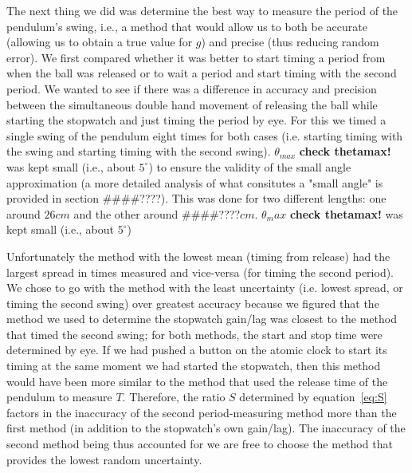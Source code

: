 \documentclass[iop,numberedappendix,appendixfloats]{emulateapj}
\def\g{$g$}
\def\T{$T$}
\def\fillin{\#\#\#\#????}
\def\deg{^{\circ}}
\begin{document}
The next thing we did was determine the best way to measure the period of the 
pendulum's swing, i.e., a method that would allow us to both be accurate 
(allowing us to obtain a true value for \g) and precise (thus reducing random 
error). We first compared whether it was better to start timing a period from 
when the ball was released or to wait a period and start timing with the 
second period.  We wanted to see if there was a difference in accuracy and 
precision between the simultaneous double hand movement of releasing the ball 
while starting the stopwatch and just timing the period by eye. For this we 
timed a single swing of the pendulum eight times for both cases (i.e. starting 
timing with the swing and starting timing with the second swing). $\theta_{max}$ 
{\bf check thetamax!} was kept small (i.e., about $5\deg$) to ensure the 
validity of the small angle approximation (a more detailed analysis of what 
consitutes a "small angle" is provided in section \fillin). This was done 
for two different lengths: one around $26cm$ and the other around \fillin$cm$. 
$\theta_max$ {\bf check thetamax!} was kept small (i.e., about $5\deg$) 

Unfortunately the method with the lowest 
mean (timing from release) had the largest spread in times measured and 
vice-versa (for timing the second period). We chose to go 
with the method with the least uncertainty (i.e. lowest spread, or timing the 
second swing) over greatest accuracy because we figured that the method we 
used to determine the stopwatch gain/lag was closest to the method that timed 
the second swing; for both methods, the start and stop time were determined by 
eye.  If we had pushed a button on the atomic clock to start its timing at the 
same moment we had started the stopwatch, then this method would have been 
more similar to the method that used the release time of the pendulum to 
measure \T.  Therefore, the ratio $S$ determined by equation~\ref{eq:S} 
factors in the inaccuracy of the second period-measuring method more 
than the first method (in addition to the stopwatch's own gain/lag). The 
inaccuracy of the second method being thus accounted for we are free to choose 
the method that provides the lowest random uncertainty. 
\end{document}
